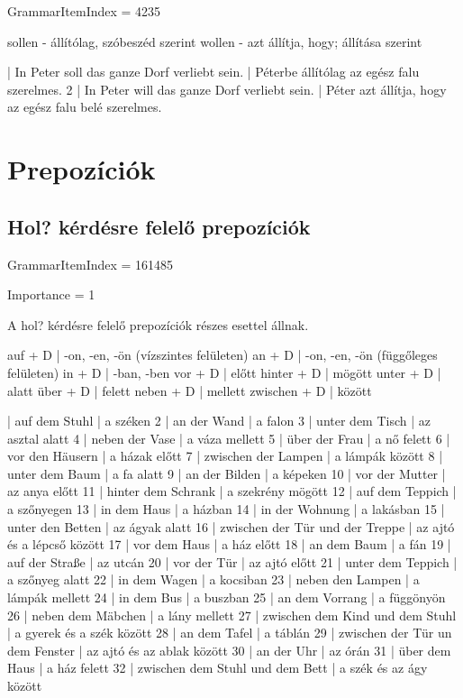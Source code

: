\documentclass{article}
\newenvironment{desc}{\verbatim}{\endverbatim}
\newenvironment{exmp}{\verbatim}{\endverbatim}
\begin{document}
GrammarItemIndex = 4235

\begin{desc}

sollen - állítólag, szóbeszéd szerint
wollen - azt állítja, hogy; állítása szerint

\end{desc}

\begin{exmp}
1 | In Peter soll das ganze Dorf verliebt sein. | Péterbe állítólag az egész falu szerelmes.
2 | In Peter will das ganze Dorf verliebt sein. | Péter azt állítja, hogy az egész falu belé szerelmes.
\end{exmp}

\section{Prepozíciók}

\subsection{Hol? kérdésre felelő prepozíciók}

GrammarItemIndex = 161485

Importance = 1

\begin{desc}
A hol? kérdésre felelő prepozíciók részes esettel állnak.

auf + D      | -on, -en, -ön (vízszintes felületen)
an + D       | -on, -en, -ön (függőleges felületen)
in + D       | -ban, -ben
vor + D      | előtt
hinter + D   | mögött
unter + D    | alatt
über + D     | felett
neben + D    | mellett
zwischen + D | között
\end{desc}

\begin{exmp}
1 | auf dem Stuhl | a széken
2 | an der Wand | a falon
3 | unter dem Tisch | az asztal alatt
4 | neben der Vase | a váza mellett
5 | über der Frau | a nő felett
6 | vor den Häusern | a házak előtt
7 | zwischen der Lampen | a lámpák között
8 | unter dem Baum | a fa alatt
9 | an der Bilden | a képeken
10 | vor der Mutter | az anya előtt
11 | hinter dem Schrank | a szekrény mögött
12 | auf dem Teppich | a szőnyegen
13 | in dem Haus | a házban
14 | in der Wohnung | a lakásban
15 | unter den Betten | az ágyak alatt
16 | zwischen der Tür und der Treppe | az ajtó és a lépcső között
17 | vor dem Haus | a ház előtt
18 | an dem Baum | a fán
19 | auf der Straße | az utcán
20 | vor der Tür | az ajtó előtt
21 | unter dem Teppich | a szőnyeg alatt
22 | in dem Wagen | a kocsiban
23 | neben den Lampen | a lámpák mellett
24 | in dem Bus | a buszban
25 | an dem Vorrang | a függönyön
26 | neben dem Mäbchen | a lány mellett
27 | zwischen dem Kind und dem Stuhl | a gyerek és a szék között
28 | an dem Tafel | a táblán
29 | zwischen der Tür un dem Fenster | az ajtó és az ablak között
30 | an der Uhr | az órán
31 | über dem Haus | a ház felett
32 | zwischen dem Stuhl und dem Bett | a szék és az ágy között
\end{exmp}
\end{document}
